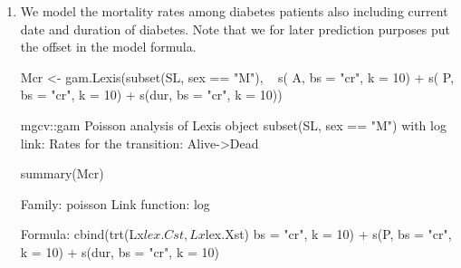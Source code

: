 \begin{enumerate}[resume]


\item We model the mortality rates among diabetes patients also
  including current date and duration of diabetes. Note that we for
  later prediction purposes put the offset in the model formula.
\begin{Schunk}
\begin{Sinput}
 Mcr <- gam.Lexis(subset(SL, sex == "M"),
                  ~ s(  A, bs = "cr", k = 10) +
                    s(  P, bs = "cr", k = 10) +
                    s(dur, bs = "cr", k = 10))
\end{Sinput}
\begin{Soutput}
mgcv::gam Poisson analysis of Lexis object subset(SL, sex == "M") with log link:
Rates for the transition:
Alive->Dead
\end{Soutput}
\begin{Sinput}
 summary(Mcr)
\end{Sinput}
\begin{Soutput}
Family: poisson 
Link function: log 

Formula:
cbind(trt(Lx$lex.Cst, Lx$lex.Xst) %in% trnam, Lx$lex.dur) ~ s(A, 
    bs = "cr", k = 10) + s(P, bs = "cr", k = 10) + s(dur, bs = "cr", 
    k = 10)


\end{Soutput}
\end{Schunk}
\end{enumerate}
